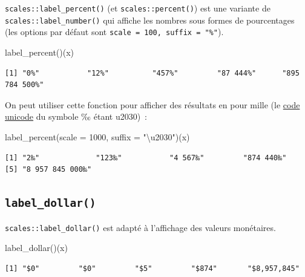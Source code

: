 \documentclass[
  letterpaper,
  DIV=11,
  numbers=noendperiod,
  oneside]{scrreprt}
\newenvironment{Shaded}{\begin{snugshade}}{\end{snugshade}}
\newcommand{\AttributeTok}[1]{\textcolor[rgb]{0.40,0.45,0.13}{#1}}
\newcommand{\DecValTok}[1]{\textcolor[rgb]{0.68,0.00,0.00}{#1}}
\newcommand{\FunctionTok}[1]{\textcolor[rgb]{0.28,0.35,0.67}{#1}}
\newcommand{\NormalTok}[1]{\textcolor[rgb]{0.00,0.23,0.31}{#1}}
\newcommand{\StringTok}[1]{\textcolor[rgb]{0.13,0.47,0.30}{#1}}
\begin{document}
\texttt{scales::label\_percent()} (et \texttt{scales::percent()}) est
une variante de \texttt{scales::label\_number()} qui affiche les nombres
sous formes de pourcentages (les options par défaut sont
\texttt{scale\ =\ 100,\ suffix\ =\ "\%"}).

\begin{Shaded}
\begin{Highlighting}[]
\FunctionTok{label\_percent}\NormalTok{()(x)}
\end{Highlighting}
\end{Shaded}

\begin{verbatim}
[1] "0%"           "12%"          "457%"         "87 444%"      "895 784 500%"
\end{verbatim}

On peut utiliser cette fonction pour afficher des résultats en pour
mille (le \href{https://unicode-table.com/fr/2030/}{code unicode} du
symbole ‰ étant u2030)~:

\begin{Shaded}
\begin{Highlighting}[]
\FunctionTok{label\_percent}\NormalTok{(}\AttributeTok{scale =} \DecValTok{1000}\NormalTok{, }\AttributeTok{suffix =} \StringTok{"\textbackslash{}u2030"}\NormalTok{)(x)}
\end{Highlighting}
\end{Shaded}

\begin{verbatim}
[1] "2‰"             "123‰"           "4 567‰"         "874 440‰"      
[5] "8 957 845 000‰"
\end{verbatim}

\hypertarget{label_dollar}{%
\subsection{\texorpdfstring{\texttt{label\_dollar()}}{label\_dollar()}}\label{label_dollar}}

\texttt{scales::label\_dollar()} est adapté à l'affichage des valeurs
monétaires.

\begin{Shaded}
\begin{Highlighting}[]
\FunctionTok{label\_dollar}\NormalTok{()(x)}
\end{Highlighting}
\end{Shaded}

\begin{verbatim}
[1] "$0"         "$0"         "$5"         "$874"       "$8,957,845"
\end{verbatim}
\end{document}
